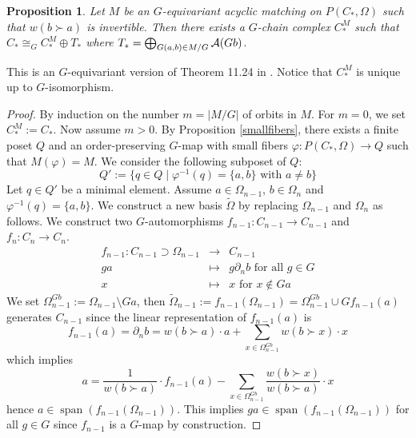 \documentclass{elsarticle}
\newtheorem{prop}[df]{Proposition}
\def\span{\operatorname{span}}
\begin{document}
\begin{prop}
\label{eqthm}
Let $M$ be an $G$-equivariant acyclic matching on $P(C_*,\Omega)$ such that $w(b\succ a)$ is invertible. Then there exists a $G$-chain complex $C_*^M$ such that $C_*\cong_G C_*^M\oplus T_*$ where $T_*=\bigoplus_{G(a,b)\in M/G}{\cal A}(Gb)$.
\end{prop}
This is an $G$-equivariant version of Theorem 11.24 in \cite[Chapter 11.3]{buch}. Notice that $C_*^M$ is unique up to $G$-isomorphism.
\begin{proof}
By induction on the number $m=|M/G|$ of orbits in $M$. For $m=0$, we set $C_*^M:=C_*$. Now assume $m>0$. By Proposition \ref{smallfibers}, there exists a finite poset $Q$ and an order-preserving $G$-map with small fibers $\varphi:P(C_*,\Omega)\longrightarrow Q$ such that $M(\varphi)=M$. We consider the following subposet of $Q$:
\[
Q':=\{q\in Q\mid\varphi^{-1}(q)=\{a,b\}\text{ with }a\not=b\}
\]
Let $q\in Q'$ be a minimal element. Assume $a\in\Omega_{n-1}$, $b\in\Omega_n$ and $\varphi^{-1}(q)=\{a,b\}$. We construct a new basis $\widetilde\Omega$ by replacing $\Omega_{n-1}$ and $\Omega_n$ as follows. We construct two $G$-automorphisms $f_{n-1}:C_{n-1}\longrightarrow C_{n-1}$ and $f_n:C_n\longrightarrow C_n$.
\begin{eqnarray*}
f_{n-1}:C_{n-1}\supset\Omega_{n-1}&\longrightarrow&C_{n-1}\\
ga&\longmapsto&g\partial_n b\text{ for all $g\in G$}\\
x&\longmapsto&x\text{ for $x\not\in Ga$}
\end{eqnarray*}
We set $\Omega^{Gb}_{n-1}:=\Omega_{n-1}\setminus Ga$, then $\widetilde\Omega_{n-1}:=f_{n-1}(\Omega_{n-1})=\Omega^{Gb}_{n-1}\cup Gf_{n-1}(a)$ generates $C_{n-1}$ since the linear representation of $f_{n-1}(a)$ is
\[
f_{n-1}(a)=\partial_n b=w(b\succ a)\cdot a+\sum_{x\in\Omega^{Gb}_{n-1}}w(b\succ x)\cdot x
\]
which implies
\[
a=\frac 1{w(b\succ a)}\cdot f_{n-1}(a)-\sum_{x\in\Omega^{Gb}_{n-1}}\frac{w(b\succ x)}{w(b\succ a)}\cdot x
\]
hence $a\in\span(f_{n-1}(\Omega_{n-1}))$. This implies $ga\in\span(f_{n-1}(\Omega_{n-1}))$ for all $g\in G$ since $f_{n-1}$ is a $G$-map by construction.


\end{proof}
\end{document}
